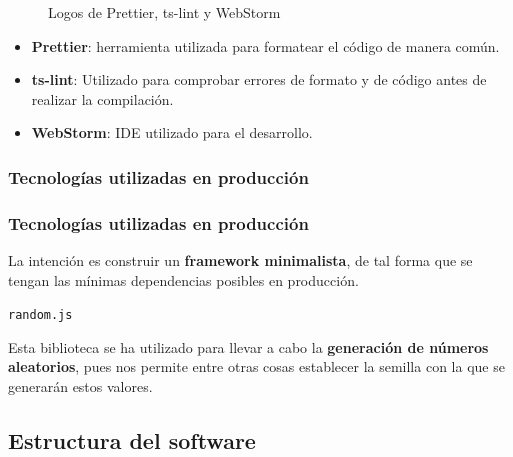 \documentclass{beamer}
\begin{document}
\begin{frame}
\begin{figure}
    \caption{Logos de Prettier, ts-lint y WebStorm}
    \label{fig:1}
\end{figure}

\begin{itemize}
    \item \textbf{Prettier}: herramienta utilizada para formatear el código de manera común.
    \item \textbf{ts-lint}: Utilizado para comprobar errores de formato y de código antes de realizar la compilación.
    \item \textbf{WebStorm}: IDE utilizado para el desarrollo.
\end{itemize}

\end{frame}

\subsubsection{Tecnologías utilizadas en producción}

\begin{frame}
\frametitle{Tecnologías utilizadas en producción}

La intención es construir un \textbf{framework minimalista}, de tal forma que se tengan las mínimas dependencias posibles en producción.

\begin{center}
    \Huge \texttt{random.js}
\end{center}

\bigskip

Esta biblioteca se ha utilizado para llevar a cabo la \textbf{generación de números aleatorios}, pues nos permite entre otras cosas establecer la semilla con la que se generarán estos valores.

\end{frame}

\subsection{Estructura del software}
\end{document}
